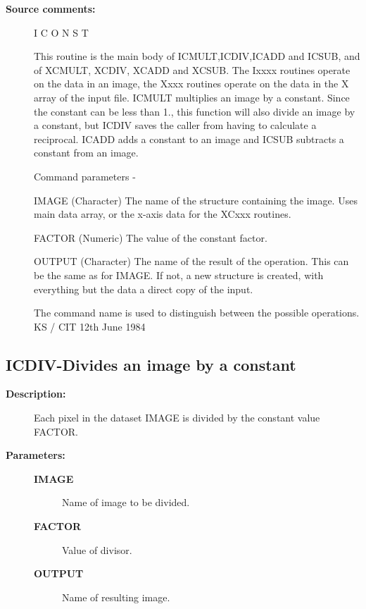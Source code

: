 \begin{description}
\begin{description}
\item [\textbf{Source comments:}]
\begin{terminalv}
 I C O N S T

 This routine is the main body of ICMULT,ICDIV,ICADD and ICSUB,
 and of XCMULT, XCDIV, XCADD and XCSUB.  The Ixxxx routines
 operate on the data in an image, the Xxxx routines operate on
 the data in the X array of the input file.
 ICMULT multiplies an image by a constant.  Since the constant
 can be less than 1., this function will also divide an
 image by a constant, but ICDIV saves the caller from having
 to calculate a reciprocal. ICADD adds a constant to an image and
 ICSUB subtracts a constant from an image.

 Command parameters -

 IMAGE  (Character) The name of the structure containing the image.
        Uses main data array, or the x-axis data for the XCxxx routines.

 FACTOR (Numeric) The value of the constant factor.

 OUTPUT (Character) The name of the result of the operation.  This
        can be the same as for IMAGE.  If not, a new structure
        is created, with everything but the data a direct
        copy of the input.

 The command name is used to distinguish between the
 possible operations.
                                  KS / CIT 12th June 1984
\end{terminalv}
\end{description}
\subsection{ICDIV-\label{ICDIV}Divides an image by a constant}
\begin{description}

\item [\textbf{Description:}]
 Each pixel in the dataset IMAGE is divided by the
 constant value FACTOR.

\item [\textbf{Parameters:}]
\begin{description}
\item [\textbf{IMAGE}]
 Name of image to be divided.
\item [\textbf{FACTOR}]
 Value of divisor.
\item [\textbf{OUTPUT}]
 Name of resulting image.
\end{description}


\end{description}
\end{description}
